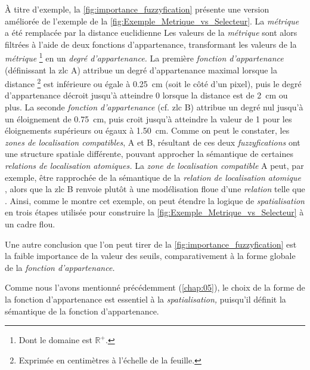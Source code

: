À titre d'exemple, la \autoref{fig:importance_fuzzyfication} présente
une version améliorée de l'exemple de la
\autoref{fig:Exemple_Metrique_vs_Selecteur}. La \emph{métrique} a été
remplacée par la distance euclidienne
%
Les valeurs de la \emph{métrique} sont alors filtrées à l'aide de deux
fonctions d'appartenance, transformant les valeurs de la
\emph{métrique} \footnote{Dont le domaine est \(\mathbb{R}^+\).} en un
\emph{degré d'appartenance.} La première \emph{fonction
  d'appartenance} (définissant la \ac{zlc}
\textcolor{RdBu-9-1}{\textsf{A}}) attribue un degré d'appartenance
maximal lorsque la distance \footnote{Exprimée en centimètres à
  l'échelle de la feuille.} est inférieure ou égale à
\SI{0,25}{\centi\meter} (soit le côté d'un pixel), puis le degré
d'appartenance décroit jusqu'à atteindre 0 lorsque la distance est de
\SI{2}{\centi\meter} ou plus. La seconde \emph{fonction
  d'appartenance} (cf. \ac{zlc} \textcolor{RdBu-9-9}{\textsf{B}})
attribue un degré nul jusqu'à un éloignement de
\SI{0,75}{\centi\meter}, puis croit jusqu'à atteindre la valeur de 1
pour les éloignements supérieurs ou égaux à
\SI{1,50}{\centi\meter}. Comme on peut le constater, les \emph{zones
  de localisation compatibles}, \textcolor{RdBu-9-1}{\textsf{A}} et
\textcolor{RdBu-9-9}{\textsf{B}}, résultant de ces deux
\emph{fuzzyfications} ont une structure spatiale différente, pouvant
approcher la sémantique de certaines \emph{relations de localisation
  atomiques.} La \emph{zone de localisation compatible}
\textcolor{RdBu-9-1}{\textsf{A}} peut, par exemple, être rapprochée de
la sémantique de la \emph{relation de localisation atomique}
, alors que la \ac{zlc}
\textcolor{RdBu-9-9}{\textsf{B}} renvoie plutôt à une modélisation
floue d'une \emph{relation} telle que .
%
Ainsi, comme le montre cet exemple, on peut étendre la logique de
\emph{spatialisation} en trois étapes utilisée pour construire la
\autoref{fig:Exemple_Metrique_vs_Selecteur} à un cadre flou.

Une autre conclusion que l'on peut tirer de la
\autoref{fig:importance_fuzzyfication} est la faible importance de la
valeur des seuils, comparativement à la forme globale de la
\emph{fonction d'appartenance.}

Comme nous l'avons mentionné précédemment (\autoref{chap:05}), le
choix de la forme de la fonction d'appartenance est essentiel à la
\emph{spatialisation,} puisqu'il définit la sémantique de la fonction
d'appartenance.

